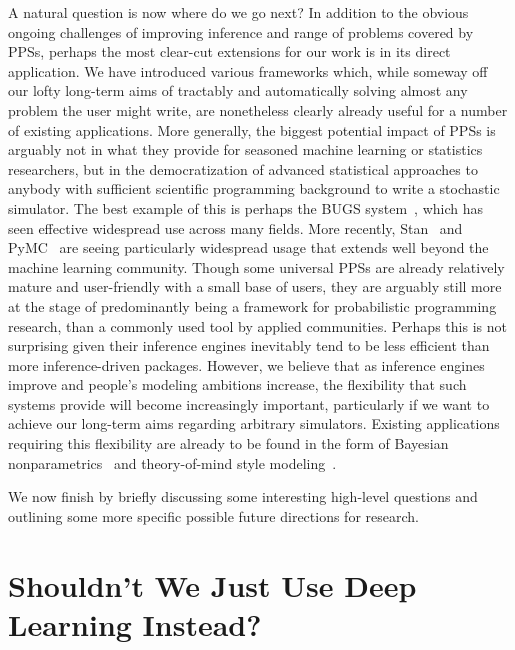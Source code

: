 A natural question is now where do we go next?  In addition to the obvious ongoing challenges
of improving inference and range of problems covered by PPSs, perhaps the most clear-cut 
extensions for our
work is in its direct application.  We have introduced various frameworks which, while someway off
our lofty long-term aims of tractably and automatically solving almost any problem the 
user might write, are nonetheless clearly already useful for a number of existing applications.  
More generally, the biggest
potential impact of PPSs is arguably not in what they provide for seasoned machine learning or 
statistics researchers, but in the democratization of advanced statistical approaches to anybody with sufficient
scientific programming background to write a stochastic simulator.  The best example of this is
perhaps the BUGS system~\cite{spiegelhalter1996bugs}, which has seen effective widespread use across
many fields.
More recently, Stan~\citep{carpenter2015stan} and PyMC~\citep{salvatier2016probabilistic} 
are seeing particularly widespread usage that extends well beyond
the machine learning community.  Though some universal PPSs are already relatively 
mature and user-friendly with a small base of users, they are arguably still more
at the stage of predominantly being a framework for probabilistic programming
research, than a commonly used tool by applied communities.  Perhaps this is not surprising given
their inference engines inevitably tend to be less efficient than more inference-driven packages.
However, we believe that as inference engines improve and people's modeling ambitions
increase, the flexibility that such systems provide will become increasingly important,
particularly if we want to achieve our long-term aims regarding arbitrary simulators.
Existing applications requiring this flexibility are already to be found in the form of Bayesian
nonparametrics~\citep{dhir2017interpreting} and theory-of-mind style 
modeling~\citep{stuhlmuller2014reasoning}.

We now finish by briefly discussing some interesting high-level questions and 
outlining some more specific possible future directions for research. 

\section{Shouldn't We Just Use Deep Learning Instead?}

